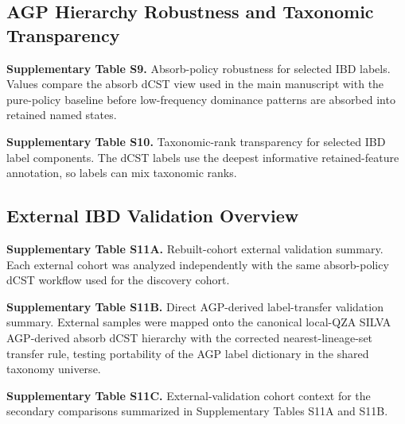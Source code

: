 \documentclass[11pt]{article}
\begin{document}


\bigskip

\subsection*{AGP Hierarchy Robustness and Taxonomic Transparency}

\noindent\textbf{Supplementary Table S9.} Absorb-policy robustness for
selected IBD labels. Values compare the absorb dCST view used in the
main manuscript with the pure-policy baseline before low-frequency
dominance patterns are absorbed into retained named states.



\bigskip

\noindent\textbf{Supplementary Table S10.} Taxonomic-rank transparency
for selected IBD label components. The dCST labels use the deepest
informative retained-feature annotation, so labels can mix taxonomic
ranks.



\subsection*{External IBD Validation Overview}

\noindent\textbf{Supplementary Table S11A.} Rebuilt-cohort external
validation summary. Each external cohort was analyzed independently with
the same absorb-policy dCST workflow used for the discovery cohort.



\medskip

\noindent\textbf{Supplementary Table S11B.} Direct AGP-derived label-transfer
validation summary. External samples were mapped onto the canonical
local-QZA SILVA AGP-derived absorb dCST hierarchy with the corrected
nearest-lineage-set transfer rule, testing portability of the AGP label
dictionary in the shared taxonomy universe.



\medskip

\noindent\textbf{Supplementary Table S11C.} External-validation cohort
context for the secondary comparisons summarized in Supplementary Tables
S11A and S11B.
\end{document}
